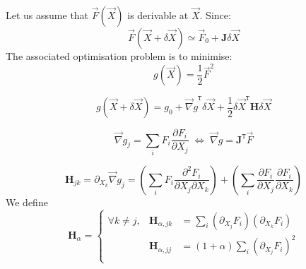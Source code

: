 \documentclass[aps,12pt]{revtex4}
\newcommand{\trn}[1]{{#1}^{\mathtt{T}}}
\begin{document}
Let us assume that $\vec{F}(\vec{X})$ is derivable at $\vec{X}$.
Since:
\begin{equation}
	\vec{F}(\vec{X}+\delta\vec{X}) \simeq \vec{F}_0 + \bm{J} \delta\vec{X}
\end{equation}
The associated optimisation problem is to minimise:
\begin{equation}
	g(\vec{X}) = \dfrac{1}{2} \vec{F}^2
\end{equation}

\begin{equation}
	g(\vec{X}+\delta\vec{X}) = g_0 + \trn{\vec{\nabla}g} \delta\vec{X} + \dfrac{1}{2} \trn{\delta\vec{X}} \bm{H} \delta\vec{X}
\end{equation}

\begin{equation}
	\vec{\nabla}g_j = \sum_i F_i \dfrac{\partial F_i}{\partial X_j} \; \Leftrightarrow \; \vec{\nabla}g = \trn{\bm{J}} \vec{F}
\end{equation}

\begin{equation}
	\bm{H}_{jk} = \partial_{X_k} \vec{\nabla}g_j 
	= 
	\left( \sum_i F_i \dfrac{\partial^2 F_i}{\partial X_j \partial X_k} \right)
	+ \left( \sum_i \dfrac{\partial F_i}{\partial X_j} \dfrac{\partial F_i}{\partial X_k}\right)
\end{equation}
We define
\begin{equation}
	\bm{H}_\alpha 
	= 
	\left\lbrace
	\begin{array}{rcl}
	\forall k\not=j, &  \bm{H}_{\alpha,jk} & =   \sum_i (\partial_{X_j} F_i)( \partial_{X_k} F_i)\\
	                &  \bm{H}_{\alpha,jj} &  =  (1+\alpha) \sum_i (\partial_{X_j} F_i)^2\\
	\end{array}
	\right.
\end{equation}
\end{document}
